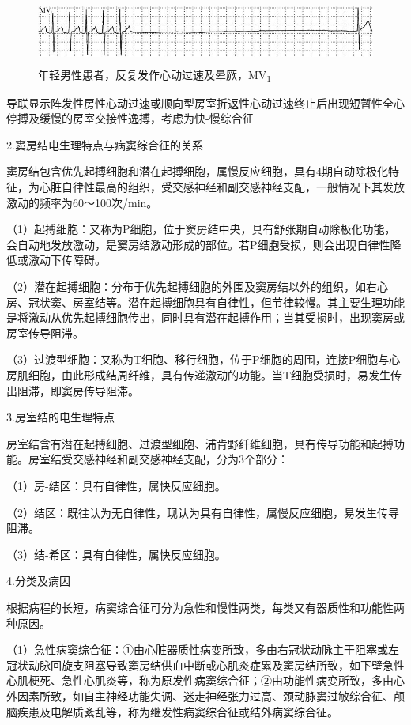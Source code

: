 \begin{figure}[!htbp]
 \centering
 \includegraphics[width=5.60417in,height=0.83333in]{./images/Image00457.jpg}
 \captionsetup{justification=centering}
 \caption{年轻男性患者，反复发作心动过速及晕厥，MV\textsubscript{1}}
 \label{fig27-2}
  \end{figure} 
导联显示阵发性房性心动过速或顺向型房室折返性心动过速终止后出现短暂性全心停搏及缓慢的房室交接性逸搏，考虑为快-慢综合征

2.窦房结电生理特点与病窦综合征的关系

窦房结包含优先起搏细胞和潜在起搏细胞，属慢反应细胞，具有4期自动除极化特征，为心脏自律性最高的组织，受交感神经和副交感神经支配，一般情况下其发放激动的频率为60～100次/min。

（1）起搏细胞：又称为P细胞，位于窦房结中央，具有舒张期自动除极化功能，会自动地发放激动，是窦房结激动形成的部位。若P细胞受损，则会出现自律性降低或激动下传障碍。

（2）潜在起搏细胞：分布于优先起搏细胞的外围及窦房结以外的组织，如右心房、冠状窦、房室结等。潜在起搏细胞具有自律性，但节律较慢。其主要生理功能是将激动从优先起搏细胞传出，同时具有潜在起搏作用；当其受损时，出现窦房或房室传导阻滞。

（3）过渡型细胞：又称为T细胞、移行细胞，位于P细胞的周围，连接P细胞与心房肌细胞，由此形成结周纤维，具有传递激动的功能。当T细胞受损时，易发生传出阻滞，即窦房传导阻滞。

3.房室结的电生理特点

房室结含有潜在起搏细胞、过渡型细胞、浦肯野纤维细胞，具有传导功能和起搏功能。房室结受交感神经和副交感神经支配，分为3个部分：

（1）房-结区：具有自律性，属快反应细胞。

（2）结区：既往认为无自律性，现认为具有自律性，属慢反应细胞，易发生传导阻滞。

（3）结-希区：具有自律性，属快反应细胞。

4.分类及病因

根据病程的长短，病窦综合征可分为急性和慢性两类，每类又有器质性和功能性两种原因。

（1）急性病窦综合征：①由心脏器质性病变所致，多由右冠状动脉主干阻塞或左冠状动脉回旋支阻塞导致窦房结供血中断或心肌炎症累及窦房结所致，如下壁急性心肌梗死、急性心肌炎等，称为原发性病窦综合征；②由功能性病变所致，多由心外因素所致，如自主神经功能失调、迷走神经张力过高、颈动脉窦过敏综合征、颅脑疾患及电解质紊乱等，称为继发性病窦综合征或结外病窦综合征。

